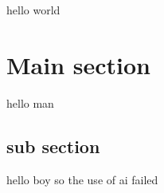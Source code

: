 hello world
\section{Main section}
hello man
\subsection{sub section}
hello boy \cite{chaika_role_2023}
so the use of ai failed \cite{zang_adaptive_2022}